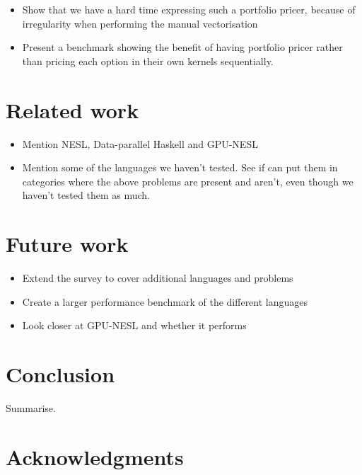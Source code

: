 \documentclass{llncs2e/llncs}
\begin{document}
\begin{itemize}
\item Show that we have a hard time expressing such a portfolio
  pricer, because of irregularity when performing the manual
  vectorisation
\item Present a benchmark showing the benefit of having portfolio
  pricer rather than pricing each option in their own kernels
  sequentially.
\end{itemize}

\section{Related work}
\begin{itemize}
\item Mention NESL, Data-parallel Haskell and GPU-NESL
\item Mention some of the languages we haven't tested. See if can put
  them in categories where the above problems are present and aren't,
  even though we haven't tested them as much.
\end{itemize}

\section{Future work}
\begin{itemize}
\item Extend the survey to cover additional languages and problems
\item Create a larger performance benchmark of the different languages
\item Look closer at GPU-NESL and whether it performs
\end{itemize}

\section{Conclusion}
Summarise.

\section{Acknowledgments}

 

\end{document}

